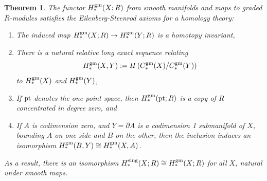 \documentclass[10pt,a4paper]{amsart}
\newtheorem{theorem}{Theorem}
\theoremstyle{definition}
\theoremstyle{remark}
\numberwithin{figure}{qchap}
\begin{document}
\begin{theorem}\label{eilenberg}The functor $H_*^{\textup{gm}}(X;R)$ from smooth manifolds and maps to graded $R$-modules satisfies the Eilenberg-Steenrod axioms for a homology theory: \begin{enumerate}
    \item The induced map $H_*^{\textup{gm}}(X;R) \to H_*^{\textup{gm}}(Y;R)$ is a homotopy invariant, 
    \item There is a natural relative long exact sequence relating 
    $$H_*^{\textup{gm}}(X,Y) := H\left(C_*^{\textup{gm}}(X)/C_*^{\textup{gm}}(Y)\right)$$ 
    to $H_*^{\textup{gm}}(X)$ and $H_*^{\textup{gm}}(Y)$, 
    \item If $\textup{pt}$ denotes the one-point space, then $H_*^{\textup{gm}}(\textup{pt};R)$ is a copy of $R$ concentrated in degree zero, and
    \item If $A$ is codimension zero, and $Y = \partial A$ is a codimension 1 submanifold of $X$, bounding $A$ on one side and $B$ on the other, then the inclusion induces an isomorphism $H_*^{\textup{gm}}(B, Y) \cong H_*^{\textup{gm}}(X, A)$.
\end{enumerate}
As a result, there is an isomorphism $H_*^{\textup{sing}}(X;R) \cong H_*^{\textup{gm}}(X;R)$ for all $X$, natural under smooth maps.
\end{theorem}
\end{document}

